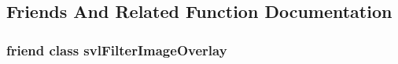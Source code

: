 \subsection{Friends And Related Function Documentation}
\hypertarget{classsvl_overlay_a83f118ae07b7352f907d08378ed1e2a8}{
\subsubsection[{svl\-Filter\-Image\-Overlay}]{\setlength{\rightskip}{0pt plus 5cm}friend class {\bf svl\-Filter\-Image\-Overlay}\hspace{0.3cm}{\ttfamily [friend]}}}\label{classsvl_overlay_a83f118ae07b7352f907d08378ed1e2a8}


